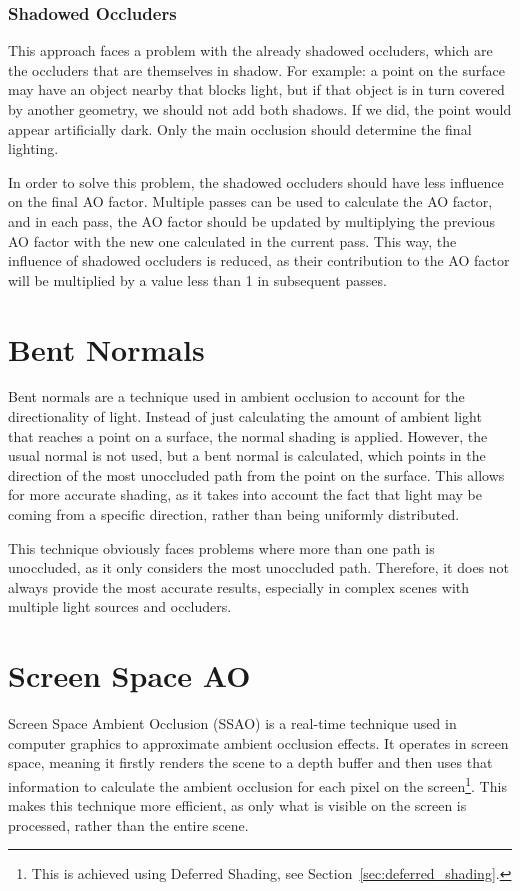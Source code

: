 \subsubsection{Shadowed Occluders}

This approach faces a problem with the already shadowed occluders, which are the occluders that are themselves in shadow. For example: a point on the surface may have an object nearby that blocks light, but if that object is in turn covered by another geometry, we should not add both shadows. If we did, the point would appear artificially dark. Only the main occlusion should determine the final lighting.

In order to solve this problem, the shadowed occluders should have less influence on the final AO factor. Multiple passes can be used to calculate the AO factor, and in each pass, the AO factor should be updated by multiplying the previous AO factor with the new one calculated in the current pass. This way, the influence of shadowed occluders is reduced, as their contribution to the AO factor will be multiplied by a value less than 1 in subsequent passes.

\section{Bent Normals}

Bent normals are a technique used in ambient occlusion to account for the directionality of light. Instead of just calculating the amount of ambient light that reaches a point on a surface, the normal shading is applied. However, the usual normal is not used, but a bent normal is calculated, which points in the direction of the most unoccluded path from the point on the surface. This allows for more accurate shading, as it takes into account the fact that light may be coming from a specific direction, rather than being uniformly distributed.

This technique obviously faces problems where more than one path is unoccluded, as it only considers the most unoccluded path. Therefore, it does not always provide the most accurate results, especially in complex scenes with multiple light sources and occluders.


\section{Screen Space AO}

Screen Space Ambient Occlusion (SSAO) is a real-time technique used in computer graphics to approximate ambient occlusion effects. It operates in screen space, meaning it firstly renders the scene to a depth buffer and then uses that information to calculate the ambient occlusion for each pixel on the screen\footnote{This is achieved using Deferred Shading, see Section~\ref{sec:deferred_shading}.}. This makes this technique more efficient, as only what is visible on the screen is processed, rather than the entire scene.

